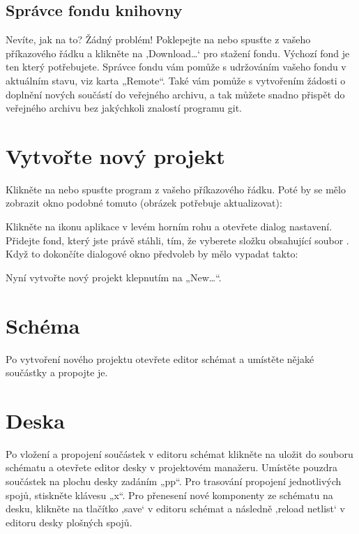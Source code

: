 \documentclass[letterpaper,10pt,czech]{sphinxmanual}
\begin{document}
\subsection{Správce fondu knihovny}
\label{\detokenize{getting-started_cz:spravce-fondu-knihovny}}
Nevíte, jak na to? Žádný problém! Poklepejte na  nebo
spusťte  z vašeho příkazového řádku a klikněte na ‚Download…‘
pro stažení fondu. Výchozí fond  je
ten který potřebujete. Správce fondu vám pomůže s udržováním
vašeho fondu v aktuálním stavu, viz karta „Remote“. Také vám pomůže s
vytvořením žádosti o doplnění nových součástí do veřejného archivu, a tak můžete snadno přispět do veřejného archivu  bez jakýchkoli znalostí programu git.


\section{Vytvořte nový projekt}
\label{\detokenize{getting-started_cz:vytvorte-novy-projekt}}
Klikněte na  nebo spusťte program  z vašeho
příkazového řádku. Poté by se  mělo zobrazit okno podobné tomuto (obrázek
potřebuje aktualizovat):

\noindent{}

Klikněte na ikonu aplikace v levém horním rohu a otevřete
dialog nastavení. Přidejte fond, který jste právě stáhli, tím, že vyberete složku obsahující soubor
. Když to dokončíte dialogové okno předvoleb by mělo vypadat takto:

\noindent{}

Nyní vytvořte nový projekt klepnutím na „New…“.


\section{Schéma}
\label{\detokenize{getting-started_cz:schema}}
Po vytvoření nového projektu otevřete editor schémat a
umístěte nějaké součástky a propojte je.


\section{Deska}
\label{\detokenize{getting-started_cz:deska}}
Po vložení a propojení součástek v editoru schémat klikněte na
uložit do souboru schématu a otevřete editor desky v projektovém
manažeru. Umístěte pouzdra součástek na plochu desky zadáním „pp“. Pro trasování
propojení jednotlivých spojů, stiskněte klávesu „x“. Pro přenesení nové komponenty ze schématu na
desku, klikněte na tlačítko ‚save‘ v editoru schémat a následně ‚reload netlist‘
v editoru desky plošných spojů.
\end{document}
